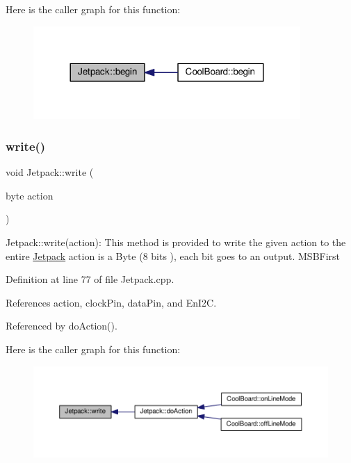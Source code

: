 Here is the caller graph for this function\+:\nopagebreak
\begin{figure}[H]
\begin{center}
\leavevmode
\includegraphics[width=288pt]{df/d1d/class_jetpack_a5a53e1ebf7aaf3bf3e0d37ea64ca09a7_icgraph}
\end{center}
\end{figure}
\mbox{\label{class_jetpack_a338f1af8cbc6504ac69b47c7328569b5}} 
\subsubsection{\texorpdfstring{write()}{write()}}
{\footnotesize\ttfamily void Jetpack\+::write (\begin{DoxyParamCaption}\item[{byte}]{action }\end{DoxyParamCaption})}

Jetpack\+::write(action)\+: This method is provided to write the given action to the entire \hyperlink{class_jetpack}{Jetpack} action is a Byte (8 bits ), each bit goes to an output. M\+S\+B\+First 

Definition at line 77 of file Jetpack.\+cpp.



References action, clock\+Pin, data\+Pin, and En\+I2C.



Referenced by do\+Action().

Here is the caller graph for this function\+:
\nopagebreak
\begin{figure}[H]
\begin{center}
\leavevmode
\includegraphics[width=350pt]{df/d1d/class_jetpack_a338f1af8cbc6504ac69b47c7328569b5_icgraph}
\end{center}
\end{figure}
\mbox{\label{class_jetpack_a79ae7bc3c1828a0551a7c005c4f8bd00}} 
